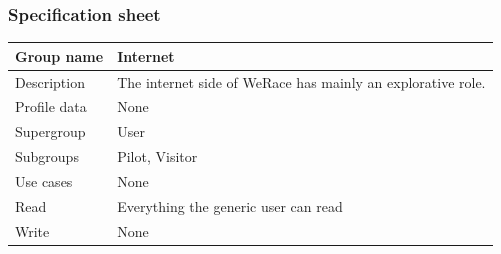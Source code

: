 \documentclass{beamer}
\newcommand{\kc}{WeRace}
\begin{document}
\begin{frame}
    \frametitle{Specification sheet}
    \begin{table}
        \tiny
        \begin{tabular}{|p{2cm}|p{6cm}|}
        \hline
        Group name & \textbf{Internet} \\
        \hline
        Description & The internet side of \kc{} has mainly an explorative role. \\
        \hline
        Profile data & None \\
        \hline
        Supergroup & User \\
        \hline
        Subgroups & Pilot, Visitor \\
        \hline
        Use cases & None \\
        \hline
        Read & Everything the generic user can read \\
        \hline
        Write & None \\
        \hline
        \end{tabular}
    \end{table}
\end{frame}
\end{document}
